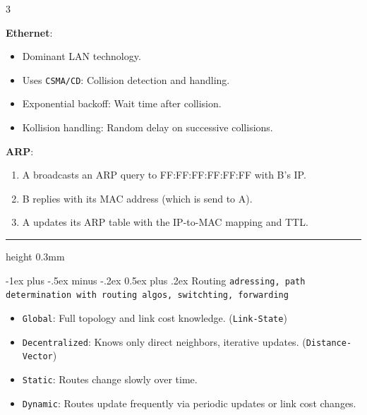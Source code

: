 \documentclass[10pt,landscape]{article}
\makeatletter
\renewcommand{\section}{\@startsection{section}{1}{0mm}%
                                {-1ex plus -.5ex minus -.2ex}%
                                {0.5ex plus .2ex}%
                                {\normalfont\large\bfseries}}
\makeatother
\begin{document}
\begin{multicols}{3}
\begin{itemize}
        \end{itemize}
\textbf{Ethernet}:
        \begin{itemize}
            \setlength{\itemsep}{0pt}
            \item Dominant LAN technology.
            \item Uses \texttt{CSMA/CD}: Collision detection and handling.
            \item Exponential backoff: Wait time after collision.
            \item Kollision handling: Random delay on successive collisions.
        \end{itemize}
\textbf{ARP}:
    \begin{enumerate}
        \item A broadcasts an ARP query to FF:FF:FF:FF:FF:FF with B's IP.
        \item B replies with its MAC address (which is send to A).
        \item A updates its ARP table with the IP-to-MAC mapping and TTL.
    \end{enumerate}


\hrule height 0.3mm

\vspace{0.1cm}
\section{Routing}
\texttt{adressing, path determination with routing algos, switchting, forwarding}

\begin{itemize}
    \setlength{\itemsep}{0pt}  %
    \item \texttt{Global}: Full topology and link cost knowledge. (\texttt{Link-State})
    \item \texttt{Decentralized}: Knows only direct neighbors, iterative updates. (\texttt{Distance-Vector})
    \item \texttt{Static}: Routes change slowly over time.
    \item \texttt{Dynamic}: Routes update frequently via periodic updates or link cost changes.
\end{itemize}


\end{multicols}
\end{document}
